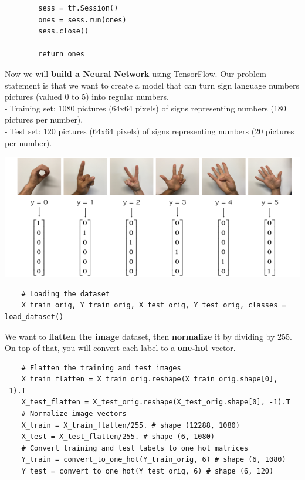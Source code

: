 \documentclass[11pt, a4paper]{article}
\begin{document}
\begin{spacing}{1.1}
\begin{lstlisting}
		sess = tf.Session()
		ones = sess.run(ones)
		sess.close()
		
		return ones	\end{lstlisting} \vspace*{1mm}
	Now we will \textbf{build a Neural Network} using TensorFlow. Our problem statement is that we want to create a model that can turn sign language numbers pictures (valued 0 to 5) into regular numbers. \vspace*{.5mm} \\
	\hspace*{3mm} - Training set: 1080 pictures (64x64 pixels) of signs representing numbers (180 pictures per number). \\
	\hspace*{3mm} - Test set: 120 pictures (64x64 pixels) of signs representing numbers (20 pictures per number).
	\begin{center} \includegraphics[scale=.6]{sign_data}	\end{center}
	\begin{lstlisting}
	# Loading the dataset
	X_train_orig, Y_train_orig, X_test_orig, Y_test_orig, classes = load_dataset() \end{lstlisting} \vspace*{1mm}
	We want to \textbf{flatten the image} dataset, then \textbf{normalize} it by dividing by 255. On top of that, you will convert each label to a \textbf{one-hot} vector.
	\begin{lstlisting}
	# Flatten the training and test images
	X_train_flatten = X_train_orig.reshape(X_train_orig.shape[0], -1).T
	X_test_flatten = X_test_orig.reshape(X_test_orig.shape[0], -1).T
	# Normalize image vectors
	X_train = X_train_flatten/255. # shape (12288, 1080)
	X_test = X_test_flatten/255. # shape (6, 1080)
	# Convert training and test labels to one hot matrices
	Y_train = convert_to_one_hot(Y_train_orig, 6) # shape (6, 1080)
	Y_test = convert_to_one_hot(Y_test_orig, 6) # shape (6, 120)	\end{lstlisting} \vspace*{1mm}

\end{spacing}
\end{document}
